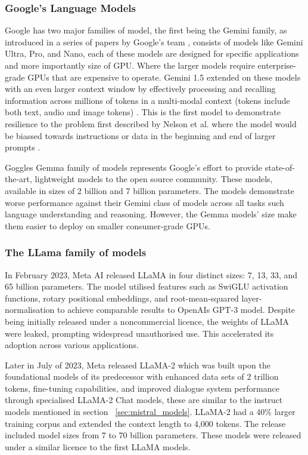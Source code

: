 \subsubsection{Google's Language Models}


Google has two major families of model, the first being the Gemini family, as introduced in a series of papers by Google's team \cite{gemini_team_gemini_2024-1}, consists of models like Gemini Ultra, Pro, and Nano, each of these models are designed for specific applications and more importantly size of GPU. Where the larger models require enterprise-grade GPUs that are expensive to operate. Gemini 1.5 extended on these models with an even larger context window by effectively processing and recalling information across millions of tokens in a multi-modal context (tokens include both text, audio and image tokens) \cite{gemini_team_gemini_2024}. This is the first model to demonstrate resilience to the problem first described by Nelson et al. where the model would be biassed towards instructions or data in the beginning and end of larger prompts \cite{liu_lost_2023}.


Goggles Gemma family of models \cite{gemma_team_gemma_2024} represents Google's effort to provide state-of-the-art, lightweight models to the open source community. These models, available in sizes of 2 billion and 7 billion parameters. The models demonstrate worse performance against their Gemini class of models across all tasks such language understanding and reasoning. However, the Gemma models’ size make them easier to deploy on smaller consumer-grade GPUs.


\subsubsection{The LLama family of models}


In February 2023, Meta AI released LLaMA \cite{touvron_llama_2023-1} in four distinct sizes: 7, 13, 33, and 65 billion parameters. The model utilised features such as SwiGLU activation functions, rotary positional embeddings, and root-mean-squared layer-normalisation to achieve comparable results to OpenAIs GPT-3 model. Despite being initially released under a noncommercial licence, the weights of LLaMA were leaked, prompting widespread unauthorised use. This accelerated its adoption across various applications.


Later in July of 2023, Meta released LLaMA-2 \cite{touvron_llama_2023-2} which was built upon the foundational models of its predecessor with enhanced data sets of 2 trillion tokens, fine-tuning capabilities, and improved dialogue system performance through specialised LLaMA-2 Chat models, these are similar to the instruct models mentioned in section ~\ref{sec:mistral_models}. LLaMA-2 had a 40\% larger training corpus and extended the context length to 4,000 tokens. The release included model sizes from 7 to 70 billion parameters. These models were released under a similar licence to the first LLaMA models.



